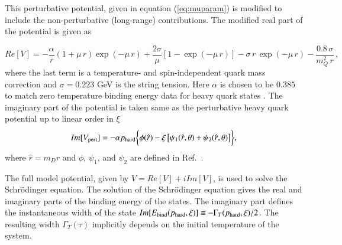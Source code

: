 This perturbative potential, given in equation (\ref{eq:muparam}) is modified to include
the non-perturbative (long-range) contributions. 
The modified real part of the potential is given as~\cite{Dumitru:2007hy} 

%
\begin{equation} 
\label{eq:repot}
Re[V] = -\frac{\alpha}{r} \left(1+\mu \, r\right) \exp\left( -\mu
\, r  \right) + \frac{2\sigma}{\mu}\left[1-\exp\left( -\mu
\, r  \right)\right] 
 - \sigma \,r\, \exp(-\mu\,r)- \frac{0.8 \, \sigma}{m_Q^2\, r} \, ,
\end{equation}
%
where the last term is a temperature- and spin-independent quark mass correction 
\cite{Bali:1997am} and $\sigma = 0.223$ GeV is the string tension.  Here  $\alpha$ 
is chosen to be  $0.385$ 
to match zero temperature
binding energy data for heavy quark states \cite{Dumitru:2007hy}.
The imaginary part of the potential is taken same as the perturbative heavy quark
potential up to linear order in $\xi$ 
%
\begin{equation} 
Im[V_{\rm pert}] = -\alpha p_{\rm hard} \biggl\{ \phi(\hat{r}) - \xi \left[\psi_1(\hat{r},
\theta)+\psi_2(\hat{r}, \theta)\right]\biggr\} ,
\label{eq:impot}
\end{equation}
%
where $\hat{r}=m_D r$ and $\phi$, $\psi_1$, and $\psi_2$ are defined in Ref.~\cite{Krouppa:2016jcl}. 

 The full model potential, given by $V = Re[V] + i Im[V]$, is used to 
solve the Schr\"odinger equation. 
The solution of the Schr\"odinger equation gives the real and imaginary parts of 
the binding energy of the states.  The imaginary part defines the instantaneous width of the state
$Im[E_{\rm bind}(p_{\rm hard},\xi)] \equiv -\Gamma_T(p_{\rm hard},\xi)/2$. 
The resulting width $\Gamma_T(\tau)$ implicitly depends on the initial temperature of the
system.


